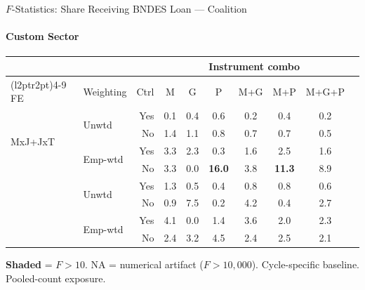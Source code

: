 \documentclass[aspectratio=169,10pt]{beamer}
\newcommand{\fpass}[1]{\cellcolor{pass}\textbf{#1}}
\begin{document}
\begin{frame}[t]{$F$-Statistics: Share Receiving BNDES Loan --- Coalition}
\framesubtitle{Custom Sector}
\begin{center}
\footnotesize
\setlength{\tabcolsep}{3.5pt}
\renewcommand{\arraystretch}{1.05}
\begin{tabular}{@{}llrccccccc@{}}
\toprule
 & & & \multicolumn{6}{c}{Instrument combo} \\
\cmidrule(l{2pt}r{2pt}){4-9}
FE & Weighting & Ctrl & M & G & P & M+G & M+P & M+G+P \\
\midrule
  \multirow{4}{*}{MxJ+JxT} & \multirow{2}{*}{Unwtd} & Yes & 0.1 & 0.4 & 0.6 & 0.2 & 0.4 & 0.2 \\
   &  & No & 1.4 & 1.1 & 0.8 & 0.7 & 0.7 & 0.5 \\
   & \multirow{2}{*}{Emp-wtd} & Yes & 3.3 & 2.3 & 0.3 & 1.6 & 2.5 & 1.6 \\
   &  & No & 3.3 & 0.0 & \fpass{16.0} & 3.8 & \fpass{11.3} & 8.9 \\
\addlinespace[5pt]
  \multirow{4}{*}{MxJ+MxT} & \multirow{2}{*}{Unwtd} & Yes & 1.3 & 0.5 & 0.4 & 0.8 & 0.8 & 0.6 \\
   &  & No & 0.9 & 7.5 & 0.2 & 4.2 & 0.4 & 2.7 \\
   & \multirow{2}{*}{Emp-wtd} & Yes & 4.1 & 0.0 & 1.4 & 3.6 & 2.0 & 2.3 \\
   &  & No & 2.4 & 3.2 & 4.5 & 2.4 & 2.5 & 2.1 \\
\bottomrule
\end{tabular}
\end{center}
{\scriptsize \colorbox{pass}{\textbf{Shaded}} = $F>10$. NA = numerical artifact ($F>10{,}000$). Cycle-specific baseline. Pooled-count exposure.}
\end{frame}
\end{document}
